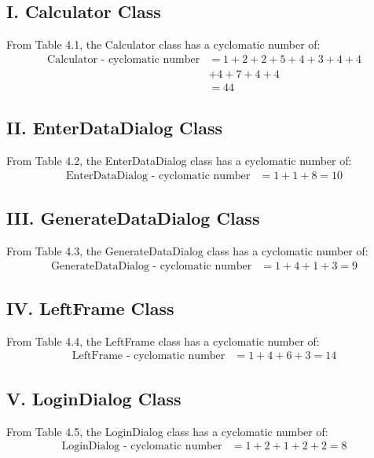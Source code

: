 \documentclass[english,12pt,a4paper]{report}
\begin{document}
	\subsection*{I. Calculator Class}
	
	From Table 4.1, the Calculator class has a cyclomatic number of:
	\begin{align*}
		\text{Calculator - cyclomatic number} &= 1 + 2 + 2 + 5 + 4 + 3 + 4 + 4 \\
		&+ 4 + 7 + 4 + 4 \\
		&= 44
	\end{align*} 
	
	\subsection*{II. EnterDataDialog Class}
	
	From Table 4.2, the EnterDataDialog class has a cyclomatic number of:
	\begin{align*}
		\text{EnterDataDialog - cyclomatic number} &= 1 + 1 + 8 = 10
	\end{align*} 
	
	\subsection*{III. GenerateDataDialog Class}
	
	From Table 4.3, the GenerateDataDialog class has a cyclomatic number of:
	\begin{align*}
		\text{GenerateDataDialog - cyclomatic number} &= 1 + 4 + 1 + 3 = 9
	\end{align*} 
	
	\subsection*{IV. LeftFrame Class}
	
	From Table 4.4, the LeftFrame class has a cyclomatic number of:
	\begin{align*}
		\text{LeftFrame - cyclomatic number} &= 1 + 4 + 6 + 3 = 14
	\end{align*} 
	
	\subsection*{V. LoginDialog Class}
	
	From Table 4.5, the LoginDialog class has a cyclomatic number of:
	\begin{align*}
		\text{LoginDialog - cyclomatic number} &= 1 + 2 + 1 + 2 + 2 = 8
	\end{align*} 
	
\end{document}
